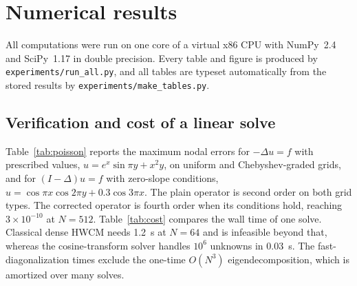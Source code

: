 \documentclass[preprint,12pt]{elsarticle}
\theoremstyle{remark}
\begin{document}
\section{Numerical results}\label{sec:results}
All computations were run on one core of a virtual x86 CPU with NumPy~2.4 and SciPy~1.17 in double
precision. Every table and figure is produced by \texttt{experiments/run\_all.py}, and all tables are
typeset automatically from the stored results by \texttt{experiments/make\_tables.py}.

\subsection{Verification and cost of a linear solve}
Table~\ref{tab:poisson} reports the maximum nodal errors for $-\Delta u=f$ with prescribed values,
$u=e^x\sin\pi y+x^2y$, on uniform and Chebyshev-graded grids, and for $(I-\Delta)u=f$ with zero-slope
conditions, $u=\cos\pi x\cos2\pi y+0.3\cos3\pi x$. The plain operator is second order on both grid types.
The corrected operator is fourth order when its conditions hold, reaching $3\times10^{-10}$ at $N=512$.
Table~\ref{tab:cost} compares the wall time of one solve. Classical dense HWCM needs 1.2~s at $N=64$
and is infeasible beyond that, whereas the cosine-transform solver handles $10^6$ unknowns in 0.03~s.
The fast-diagonalization times exclude the one-time $O(N^3)$ eigendecomposition, which is amortized
over many solves.
\end{document}
